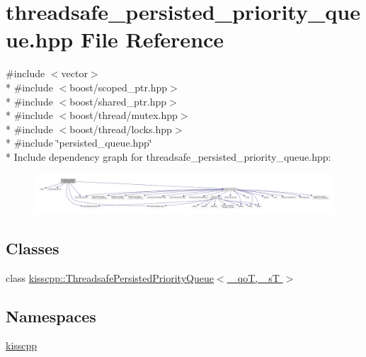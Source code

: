 \hypertarget{a00084}{\section{threadsafe\-\_\-persisted\-\_\-priority\-\_\-queue.\-hpp File Reference}
\label{a00084}
}
{\ttfamily \#include $<$vector$>$}\\*
{\ttfamily \#include $<$boost/scoped\-\_\-ptr.\-hpp$>$}\\*
{\ttfamily \#include $<$boost/shared\-\_\-ptr.\-hpp$>$}\\*
{\ttfamily \#include $<$boost/thread/mutex.\-hpp$>$}\\*
{\ttfamily \#include $<$boost/thread/locks.\-hpp$>$}\\*
{\ttfamily \#include \char`\"{}persisted\-\_\-queue.\-hpp\char`\"{}}\\*
Include dependency graph for threadsafe\-\_\-persisted\-\_\-priority\-\_\-queue.\-hpp\-:\nopagebreak
\begin{figure}[H]
\begin{center}
\leavevmode
\includegraphics[width=350pt]{a00133}
\end{center}
\end{figure}
\subsection*{Classes}
\begin{DoxyCompactItemize}
\item 
class \hyperlink{a00044}{kisscpp\-::\-Threadsafe\-Persisted\-Priority\-Queue$<$ \-\_\-qo\-T, \-\_\-s\-T $>$}
\end{DoxyCompactItemize}
\subsection*{Namespaces}
\begin{DoxyCompactItemize}
\item 
\hyperlink{a00089}{kisscpp}
\end{DoxyCompactItemize}
